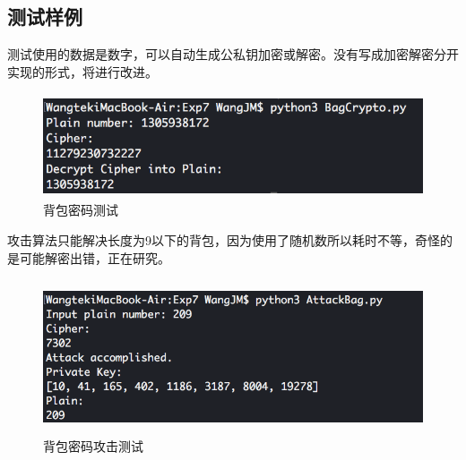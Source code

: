\documentclass[11pt]{ctexart}
\begin{document}
\subsection{测试样例} %
测试使用的数据是数字，可以自动生成公私钥加密或解密。没有写成加密解密分开实现的形式，将进行改进。
\begin{figure}[htbp]
    \centering
    \includegraphics[height=3.08cm,width=12.30cm]{Bag.png}
    \caption{背包密码测试}
    \label{bag}
    \end{figure}

攻击算法只能解决长度为9以下的背包，因为使用了随机数所以耗时不等，奇怪的是可能解密出错，正在研究。
\begin{figure}[htbp]
    \centering
    \includegraphics[height=4.56cm,width=13.16cm]{Attack.png}
    \caption{背包密码攻击测试}
    \label{attack}
    \end{figure}
\end{document}
